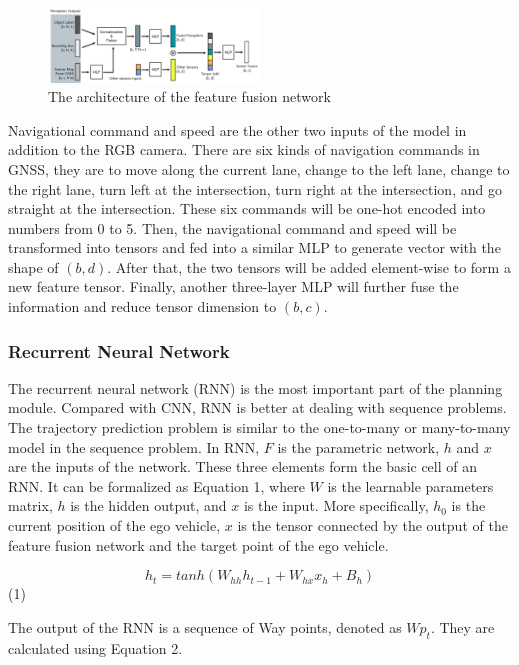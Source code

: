 \documentclass[conference]{IEEEtran}
\begin{document}
\begin{figure}[htbp]
    \centering
    \includegraphics[width=0.5\textwidth]{4.png}
    \caption{The architecture of the feature fusion network}
    \label{fig:4}
\end{figure}

Navigational command and speed are the other two inputs of the model in addition to the RGB camera. There are six kinds of navigation commands in GNSS, they are to move along the current lane, change to the left lane, change to the right lane, turn left at the intersection, turn right at the intersection, and go straight at the intersection. These six commands will be one-hot encoded into numbers from 0 to 5. Then, the navigational command and speed will be transformed into tensors and fed into a similar MLP to generate vector with the shape of \((b,d)\). After that, the two tensors will be added element-wise to form a new feature tensor. Finally, another three-layer MLP will further fuse the information and reduce tensor dimension to \((b,c)\).

\subsubsection{Recurrent Neural Network}

The recurrent neural network (RNN) is the most important part of the planning module. Compared with CNN, RNN is better at dealing with sequence problems. The trajectory prediction problem is similar to the one-to-many or many-to-many model in the sequence problem. In RNN, \(F\) is the parametric network, \(h\) and \(x\) are the inputs of the network. These three elements form the basic cell of an RNN. It can be formalized as Equation 1, where \(W\) is the learnable parameters matrix, \(h\) is the hidden output, and \(x\) is the input. More specifically, \(h_{0}\) is the current position of the ego vehicle, \(x\) is the tensor connected by the output of the feature fusion network and the target point of the ego vehicle.

\[h_{t}=tanh(W_{hh}h_{t-1}+W_{hx}x_{h}+B_{h})\] (1)

The output of the RNN is a sequence of Way points, denoted as \(Wp_{t}\). They are calculated using Equation 2.
\end{document}
